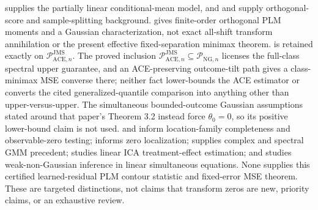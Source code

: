 \cite{Robinson1988} supplies the partially linear conditional-mean model, and \cite{ChernozhukovEtAl2018DML} and \cite{NeweyRobins2018} supply orthogonal-score and sample-splitting background. \cite{MackeySyrgkanisZadik2018} gives finite-order orthogonal PLM moments and a Gaussian characterization, not exact all-shift transform annihilation or the present effective fixed-separation minimax theorem. \cite[Theorem 5.4, condition (21), and bound (22)]{JinMackeySyrgkanis2025} is retained exactly on \(\mathcal P_{\mathrm{ACE},n}^{\mathrm{JMS}}\). The proved inclusion \(\mathcal P_{\mathrm{ACE},n}^{\mathrm{JMS}}\subseteq\mathcal P_{\mathrm{NG},n}\) licenses the full-class spectral upper guarantee, and an ACE-preserving outcome-tilt path gives a class-minimax MSE converse there; neither fact lower-bounds the ACE estimator or converts the cited generalized-quantile comparison into anything other than upper-versus-upper. The simultaneous bounded-outcome Gaussian assumptions stated around that paper's Theorem 3.2 instead force \(\theta_0=0\), so its positive lower-bound claim is not used. \cite{Mattner1992} and \cite{HuShiu2022} inform location-family completeness and observable-zero testing; \cite{DinhGhoshTranTran2021} informs zero localization; \cite{ChackoViceira2003} supplies complex and spectral GMM precedent; \cite{ReizingerEtAl2025} studies linear ICA treatment-effect estimation; and \cite{LeeMesters2024} studies weak-non-Gaussian inference in linear simultaneous equations. None supplies this certified learned-residual PLM contour statistic and fixed-error MSE theorem. These are targeted distinctions, not claims that transform zeros are new, priority claims, or an exhaustive review.